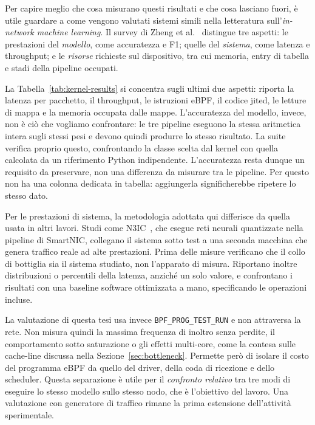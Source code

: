 \documentclass[binding=0.6cm,italian,oneside,noexaminfo]{sapthesis}
\begin{document}
Per capire meglio che cosa misurano questi risultati e che cosa lasciano fuori, è utile guardare a come vengono valutati sistemi simili nella letteratura sull'\emph{in-network machine learning}. Il survey di Zheng et al.~\cite{inmlsurvey2024} distingue tre aspetti: le prestazioni del \emph{modello}, come accuratezza e F1; quelle del \emph{sistema}, come latenza e throughput; e le \emph{risorse} richieste sul dispositivo, tra cui memoria, entry di tabella e stadi della pipeline occupati.

La Tabella~\ref{tab:kernel-results} si concentra sugli ultimi due aspetti: riporta la latenza per pacchetto, il throughput, le istruzioni eBPF, il codice jited, le letture di mappa e la memoria occupata dalle mappe. L'accuratezza del modello, invece, non è ciò che vogliamo confrontare: le tre pipeline eseguono la stessa aritmetica intera sugli stessi pesi e devono quindi produrre lo stesso risultato. La suite verifica proprio questo, confrontando la classe scelta dal kernel con quella calcolata da un riferimento Python indipendente. L'accuratezza resta dunque un requisito da preservare, non una differenza da misurare tra le pipeline. Per questo non ha una colonna dedicata in tabella: aggiungerla significherebbe ripetere lo stesso dato.

Per le prestazioni di sistema, la metodologia adottata qui differisce da quella usata in altri lavori. Studi come N3IC~\cite{n3ic2022}, che esegue reti neurali quantizzate nella pipeline di SmartNIC, collegano il sistema sotto test a una seconda macchina che genera traffico reale ad alte prestazioni. Prima delle misure verificano che il collo di bottiglia sia il sistema studiato, non l'apparato di misura. Riportano inoltre distribuzioni o percentili della latenza, anziché un solo valore, e confrontano i risultati con una baseline software ottimizzata a mano, specificando le operazioni incluse.

La valutazione di questa tesi usa invece \texttt{BPF\_PROG\_TEST\_RUN} e non attraversa la rete. Non misura quindi la massima frequenza di inoltro senza perdite, il comportamento sotto saturazione o gli effetti multi-core, come la contesa sulle cache-line discussa nella Sezione~\ref{sec:bottleneck}. Permette però di isolare il costo del programma eBPF da quello del driver, della coda di ricezione e dello scheduler. Questa separazione è utile per il \emph{confronto relativo} tra tre modi di eseguire lo stesso modello sullo stesso nodo, che è l'obiettivo del lavoro. Una valutazione con generatore di traffico rimane la prima estensione dell'attività sperimentale.
\end{document}
